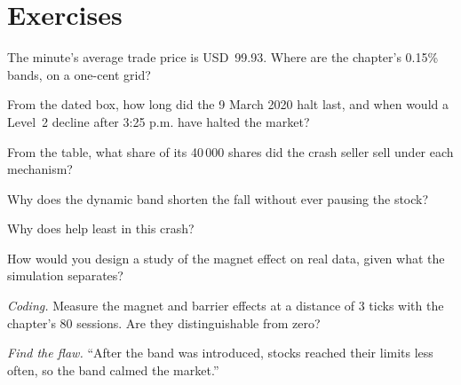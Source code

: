 \section{Exercises}

\begin{exercise}[$\star$]\label{exo:mx:circuit-breakers-and-halts:1}
The minute's average trade price is USD~99.93. Where are the chapter's 0.15\% bands, on a one-cent grid?
\end{exercise}

\begin{exercise}[$\star$]\label{exo:mx:circuit-breakers-and-halts:2}
From the dated box, how long did the 9 March 2020 halt last, and when would a Level~2 decline after 3:25 p.m. have halted the market?
\end{exercise}

\begin{exercise}[$\star$]\label{exo:mx:circuit-breakers-and-halts:3}
From the table, what share of its 40\,000 shares did the crash seller sell under each mechanism?
\end{exercise}

\begin{exercise}[$\star\star$]\label{exo:mx:circuit-breakers-and-halts:4}
Why does the dynamic band shorten the fall without ever pausing the stock?
\end{exercise}

\begin{exercise}[$\star\star$]\label{exo:mx:circuit-breakers-and-halts:5}
Why does  help least in this crash?
\end{exercise}

\begin{exercise}[$\star\star$]\label{exo:mx:circuit-breakers-and-halts:6}
How would you design a study of the magnet effect on real data, given what the simulation separates?
\end{exercise}

\begin{exercise}[$\star\star\star$]\label{exo:mx:circuit-breakers-and-halts:7}
\emph{Coding.} Measure the magnet and barrier effects at a distance of 3 ticks with the chapter's 80 sessions. Are they distinguishable from zero?
\end{exercise}

\begin{exercise}[$\star\star\star$]\label{exo:mx:circuit-breakers-and-halts:8}
\emph{Find the flaw.} ``After the band was introduced, stocks reached their limits less often, so the band calmed the market.''
\end{exercise}

